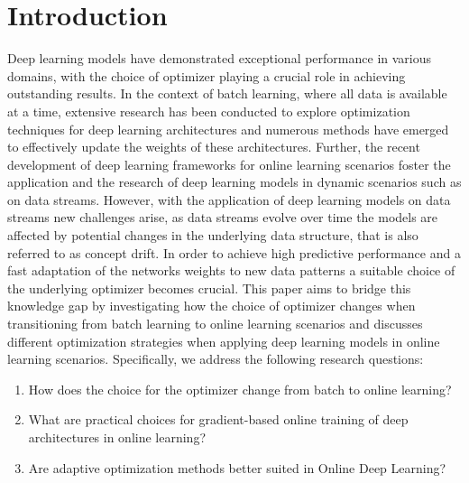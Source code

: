 \documentclass[letterpaper]{article} %
\begin{document}
\section{Introduction}
Deep learning models have demonstrated exceptional performance in various domains, with the choice of optimizer playing a crucial role in achieving outstanding results.
In the context of batch learning, where all data is available at a time, extensive research has been conducted to explore optimization techniques for deep learning architectures and numerous methods have emerged to effectively update the weights of these architectures.
Further, the recent development of deep learning frameworks for online learning scenarios foster the application and the research of deep learning models in dynamic scenarios such as on data streams. 
However, with the application of deep learning models on data streams new challenges arise, as data streams evolve over time the models are affected by potential changes in the underlying data structure, that is also referred to as concept drift. 
In order to achieve high predictive performance and a fast adaptation of the networks weights to new data patterns a suitable choice of the underlying optimizer becomes crucial.
This paper aims to bridge this knowledge gap by investigating how the choice of optimizer changes when transitioning from batch learning to online learning scenarios and discusses different optimization strategies when applying deep learning models in online learning scenarios.
Specifically, we address the following research questions:
\begin{enumerate}
	\item How does the choice for the optimizer change from batch to online learning?
	\item What are practical choices for gradient-based online training of deep architectures in online learning?
	\item Are adaptive optimization methods better suited in Online Deep Learning?
\end{enumerate}
\end{document}
